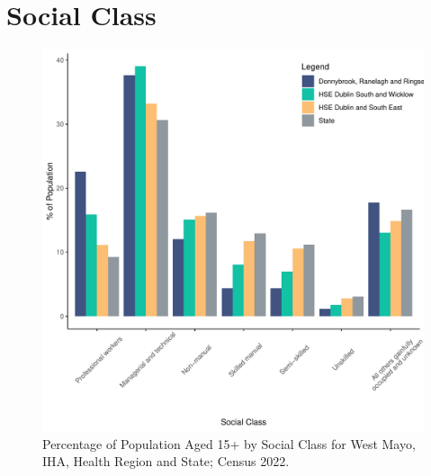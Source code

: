 \documentclass{article}
\begin{document}
\section{Social Class}\label{sect:SC}
\begin{figure}[H]
	\centering
	\includegraphics[width = 140mm]{../figures/SocialClassED.pdf}
	\caption{Percentage of Population Aged 15+ by Social Class for West Mayo, IHA, Health Region and State; Census 2022.}
	\label{fig:vbnv}
	\end{figure}
\end{document}
